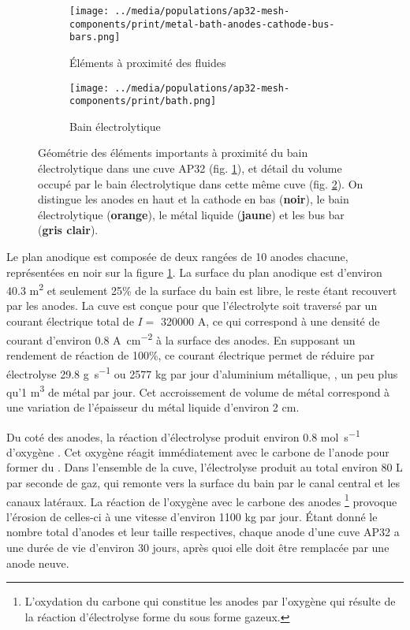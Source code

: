 \begin{figure}[t]
  \begin{center}
    \begin{subfigure}[b]{0.49\textwidth}
      \texttt{[image: ../media/populations/ap32-mesh-components/print/metal-bath-anodes-cathode-bus-bars.png]}
      \caption{Éléments à proximité des fluides}
      \label{fig:ap32-geometry-elements}
    \end{subfigure}
%
    \begin{subfigure}[b]{0.49\textwidth}
      \texttt{[image: ../media/populations/ap32-mesh-components/print/bath.png]}
      \caption{Bain électrolytique}
      \label{fig:ap32-geometry-electrolyte}
    \end{subfigure}
%
    \caption{Géométrie des éléments importants à proximité
      du bain électrolytique dans une cuve AP32
      (fig. \ref{fig:ap32-geometry-elements}), et détail du volume
      occupé par le bain électrolytique dans cette même cuve
      (fig. \ref{fig:ap32-geometry-electrolyte}). On distingue
      les anodes en haut et la cathode
      en bas (\textbf{noir}), le bain électrolytique
      (\textbf{orange}), le métal liquide (\textbf{jaune}) et les
      bus bar (\textbf{gris clair}).}
    \label{fig:ap32-geometry}
  \end{center}
\end{figure}

Le plan anodique est composée de deux rangées de 10 anodes chacune,
représentées en noir sur la figure \ref{fig:ap32-geometry-elements}. La
surface du plan anodique est d'environ \num{40.3} \si{\square\meter}
et seulement \num{25}\% de la surface du bain est libre, le reste
étant recouvert par les anodes. La cuve est conçue pour que
l'électrolyte soit traversé par un courant électrique total de $I = $
\num{320000} \si{\ampere}, ce qui correspond à une densité de courant
d'environ \num{0.8} \si{\ampere\per\square\centi\meter} à la surface
des anodes. En supposant un rendement de réaction de \num{100}\%, ce
courant électrique permet de réduire par électrolyse \num{29.8}
\si{\gram\per\second} ou \num{2577} \si{\kilo\gram} par jour
d'aluminium métallique, \ie, un peu plus qu'\num{1} \si{\cubic\meter}
de métal par jour. Cet accroissement de volume de métal correspond à
une variation de l'épaisseur du métal liquide d'environ \num{2}
\si{\centi\meter}.

Du coté des anodes, la réaction d'électrolyse produit environ
\num{0.8} \si{\mol\per\second} d'oxygène . Cet oxygène réagit
immédiatement avec le carbone de l'anode pour former du . Dans
l'ensemble de la cuve, l'électrolyse produit au total environ \num{80}
\si{\liter} par seconde de gaz, qui remonte vers la surface du bain
par le canal central et les canaux latéraux. La réaction de l'oxygène
avec le carbone des anodes \footnote{L'oxydation du carbone qui
  constitue les anodes par l'oxygène qui résulte de la réaction
  d'électrolyse forme du  sous forme gazeux.} provoque
l'érosion de celles-ci à une vitesse d'environ \num{1100}
\si{\kilo\gram} par jour. Étant donné le nombre total d'anodes et leur
taille respectives, chaque anode d'une cuve AP32 a une durée de vie
d'environ 30 jours, après quoi elle doit être remplacée par une anode
neuve.

